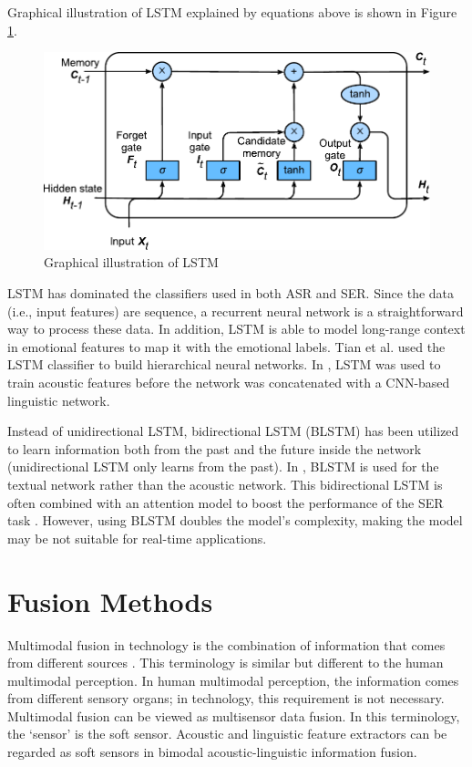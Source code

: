 Graphical illustration of LSTM explained by equations above is shown in Figure
\ref{fig:lstm}.

\begin{figure}[!hb]
\centering
\includegraphics[width=4.5in]{../fig/lstm_3.pdf}
\caption{Graphical illustration of LSTM \cite{Zhang2020}}
\label{fig:lstm}
\end{figure}

LSTM has dominated the classifiers used in both ASR and SER. Since the data
(i.e., input features) are sequence, a recurrent neural network is a
straightforward way to process these data. In addition, LSTM is able to model
long-range context in emotional features to map it with the emotional labels.
Tian et al. \cite{Tian2015} used the LSTM classifier to build hierarchical
neural networks. In \cite{Cho2018}, LSTM was used to train acoustic features
before the network was concatenated with a CNN-based linguistic network.

Instead of unidirectional LSTM, bidirectional LSTM (BLSTM) has been utilized to
learn information both from the past and the future inside the network
(unidirectional LSTM only learns from the past). In \cite{Cai2019}, BLSTM is
used for the textual network rather than the acoustic network. This
bidirectional LSTM is often combined with an attention model to boost the
performance of the SER task \cite{Atmaja2019}. However, using BLSTM doubles the
model's complexity, making the model may be not suitable for real-time
applications.

\section{Fusion Methods} 
Multimodal fusion in technology is the combination of information that comes
from different sources \cite{Khaleghi2013}. This terminology is similar but
different to the human multimodal perception. In human multimodal perception,
the information comes from different sensory organs; in technology, this
requirement is not necessary.  Multimodal fusion can be viewed as multisensor
data fusion. In this terminology, the `sensor' is the soft sensor. Acoustic and
linguistic feature extractors can be regarded as soft sensors in bimodal
acoustic-linguistic information fusion.

